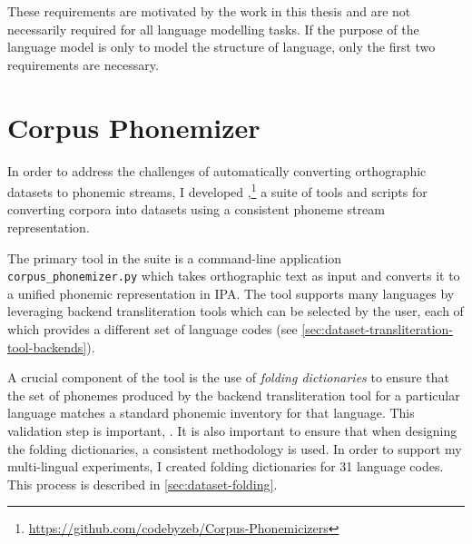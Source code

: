 These requirements are motivated by the work in this thesis and are not necessarily required for all language modelling tasks. If the purpose of the language model is only to model the structure of language, only the first two requirements are necessary. 


\section{Corpus Phonemizer}
\label{sec:dataset-corpus-phonemizer}

In order to address the challenges of automatically converting orthographic datasets to phonemic streams, I developed \corpusphonemizer,\footnote{\url{https://github.com/codebyzeb/Corpus-Phonemicizers}} a suite of tools and scripts for converting corpora into datasets using a consistent phoneme stream representation.

The primary tool in the suite is a command-line application \texttt{corpus\_phonemizer.py} which takes orthographic text as input and converts it to a unified phonemic representation in IPA. The tool supports many languages by leveraging backend transliteration tools which can be selected by the user, each of which provides a different set of language codes (see \cref{sec:dataset-transliteration-tool-backends}).

A crucial component of the tool is the use of \emph{folding dictionaries} to ensure that the set of phonemes produced by the backend transliteration tool for a particular language matches a standard phonemic inventory for that language. This validation step is important, . It is also important to ensure that when designing the folding dictionaries, a consistent methodology is used. In order to support my multi-lingual experiments, I created folding dictionaries for 31 language codes. This process is described in \cref{sec:dataset-folding}.

